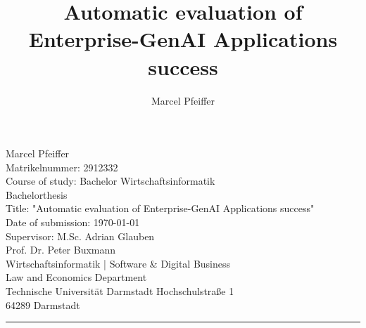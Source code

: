 \documentclass[
	english,
	ruledheaders=section,%
	class=report,%
	thesis={type=bachelor},%
	accentcolor=1b,%
	custommargins=true,%
	marginpar=false,%
	parskip=half-,%
	fontsize=11pt,%
	DIV=14,
]{tudapub}
\begin{document}


\title{Automatic evaluation of Enterprise-GenAI Applications success}

\author[M. Pfeiffer]{Marcel Pfeiffer}%


\submissiondate{\today}
\examdate{\today}


\maketitle
\newpage 

\begin{titlepage}

    \noindent
    Marcel Pfeiffer \\
    Matrikelnummer: 2912332 \\
    Course of study: Bachelor Wirtschaftsinformatik \\[0.75em]
    
    Bachelorthesis \\
    Title: "Automatic evaluation of Enterprise-GenAI Applications success" \\[0.75em]
    
    Date of submission: \today \\[0.75em]
    
    Supervisor: M.Sc. Adrian Glauben \\[0.75em]
    \noindent
    Prof. Dr. Peter Buxmann \\
    Wirtschaftsinformatik | Software \& Digital Business \\
    Law and Economics Department \\
    Technische Universität Darmstadt Hochschulstraße 1 \\
    64289 Darmstadt\\
    \noindent\rule{\textwidth}{0.4pt}
    
\end{titlepage}
\affidavit
\end{document}
